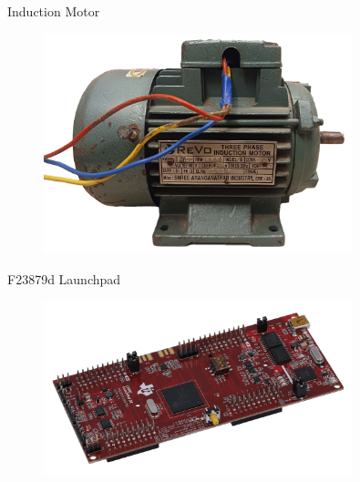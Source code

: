 \begin{frame}{Induction Motor}
	\begin{figure}
		\centering
		\includegraphics[width=0.8\textwidth]{sections/section4/images/inductionMotor/revo.png}
	\end{figure}
\end{frame}

\begin{frame}{F23879d Launchpad}
	\begin{figure}
		\centering
		\includegraphics[width=0.8\textwidth]{sections/section4/images/f23879d/launchxl-f28379d-angled.png}
	\end{figure}
\end{frame}

